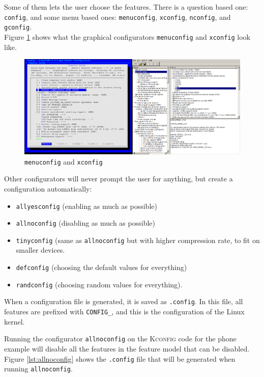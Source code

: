 \documentclass[a4paper,11pt]{report}
\newcommand{\figa}{
    \begin{figure}[!htpb]
    \centering
}
\newcommand{\figb}[2]{
    \caption{#1}
    \label{#2}
    \end{figure}
}
\begin{document}
Some of them lets the user choose the features. There is a question based 
one: \texttt{config}, and some menu based ones: \texttt{menuconfig}, 
\texttt{xconfig}, \texttt{nconfig}, and \texttt{gconfig}.
\\

Figure \ref{fig:lineofconfigs} shows what the graphical 
configurators \texttt{menuconfig} and 
\texttt{xconfig} look like.
\\


\figa
    \includegraphics[scale=0.25]{pngs/2configs.png}
\figb{\texttt{menuconfig} and \texttt{xconfig}}{fig:lineofconfigs}

Other configurators will 
never prompt the user for anything, but create a configuration automatically: 
\begin{itemize}
    \item \texttt{allyesconfig} (enabling as much as possible) 
    \item \texttt{allnoconfig} (disabling as much as possible)
    \item \texttt{tinyconfig} (same as \texttt{allnoconfig} but with higher 
    compression rate, to fit on smaller devices.
    \item \texttt{defconfig} (choosing the default values for everything)
    \item \texttt{randconfig} (choosing random values for everything).
\end{itemize}


When a configuration file is generated, it is saved as \texttt{.config}.
In this file, all features are prefixed with \texttt{CONFIG\_}, and this is
the configuration of the Linux kernel. 

Running the configurator \texttt{allnoconfig} on the \textsc{Kconfig} code for 
the phone example will disable all the features 
in the feature model that can be disabled. Figure \ref{lst:allnoconfig} shows 
the \texttt{.config} file that will be generated when running 
\texttt{allnoconfig}.
\\
\end{document}
